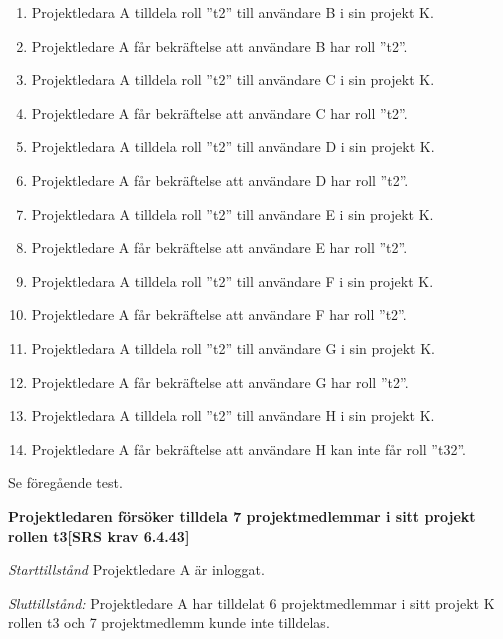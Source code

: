 \documentclass[a4paper]{article}
\begin{document}
\begin{FT}
\begin{enumerate}
\item Projektledara A tilldela roll ”t2” till användare B i sin projekt K. 
\item Projektledare A får bekräftelse att användare B har roll ”t2”.
\item Projektledara A tilldela roll ”t2” till användare C i sin projekt K. 
\item Projektledare A får bekräftelse att användare C har roll ”t2”.
\item Projektledara A tilldela roll ”t2” till användare D i sin projekt K. 
\item Projektledare A får bekräftelse att användare D har roll ”t2”.
\item Projektledara A tilldela roll ”t2” till användare E i sin projekt K. 
\item Projektledare A får bekräftelse att användare E har roll ”t2”.
\item Projektledara A tilldela roll ”t2” till användare F i sin projekt K. 
\item Projektledare A får bekräftelse att användare F har roll ”t2”.
\item Projektledara A tilldela roll ”t2” till användare G i sin projekt K. 
\item Projektledare A får bekräftelse att användare G har roll ”t2”.
\item Projektledara A tilldela roll ”t2” till användare H i sin projekt K. 
\item Projektledare A får bekräftelse att användare H kan inte får roll ”t32”.
\end{enumerate}

\item %

Se föregående test.

\item %
\textbf{Projektledaren försöker tilldela 7 projektmedlemmar i sitt projekt rollen t3[SRS krav 6.4.43]}

\emph{Starttillstånd} Projektledare A är inloggat.

\emph{Sluttillstånd:} Projektledare A  har tilldelat 6 projektmedlemmar i sitt projekt K  rollen t3 och 7 projektmedlemm kunde inte tilldelas.


\end{FT}
\end{document}
